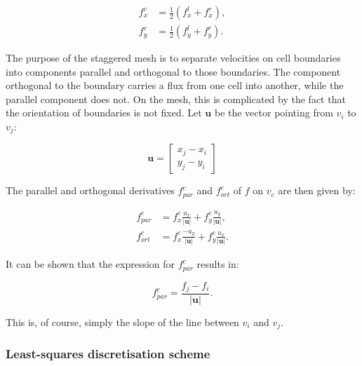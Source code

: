 \documentclass{article}
\begin{document}
\begin{align} \label{eq:disc_fxcfyc}
f_x^c &= \frac12 (f_x^l + f_x^r), \\
f_y^c &= \frac12 (f_y^l + f_y^r).
\end{align}

The purpose of the staggered mesh is to separate velocities on cell boundaries into components parallel and orthogonal to those boundaries. The component orthogonal to the boundary carries a flux from one cell into another, while the parallel component does not. On the mesh, this is complicated by the fact that the orientation of boundaries is not fixed. Let $\textbf{u}$ be the vector pointing from $v_i$ to $v_j$:

\begin{equation} \label{eq:disc_U}
\textbf{u} = \begin{bmatrix} x_j - x_i \\ y_j - y_i \end{bmatrix}
\end{equation}

The parallel and orthogonal derivatives $f_{par}^c$ and $f_{ort}^c$ of $f$ on $v_c$ are then given by:

\begin{align} \label{eq:disc_fparcfortc}
f_{par}^c &= f_x^c \frac{u_x}{|\textbf{u}|} + f_y^c \frac{u_y}{|\textbf{u}|}, \\
f_{ort}^c &= f_x^c \frac{-u_y}{|\textbf{u}|} + f_y^c \frac{u_x}{|\textbf{u}|}.
\end{align}

It can be shown that the expression for $f_{par}^c$ results in:

\begin{equation} \label{eq:disc_fparc}
f_{par}^c = \frac{f_j - f_i}{|\textbf{u}|}.
\end{equation}

This is, of course, simply the slope of the line between $v_i$ and $v_j$.

\subsubsection{Least-squares discretisation scheme}
\end{document}
